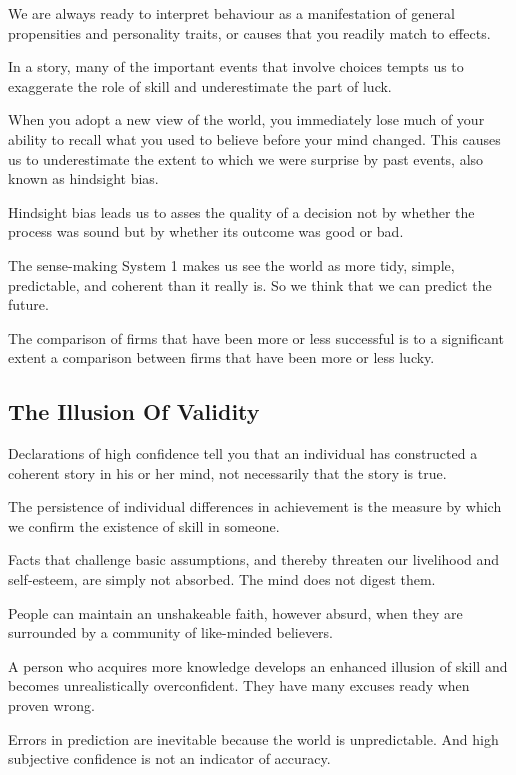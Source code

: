 \bit
\item We are always ready to interpret behaviour as a manifestation of general propensities and personality traits,
or causes that you readily match to effects.
\item In a story, many of the important events that involve choices tempts us to exaggerate the role of skill and
underestimate the part of luck.
\item When you adopt a new view of the world, you immediately lose much of your ability to recall what you used to
believe before your mind changed. This causes us to underestimate the extent to which we were surprise by past
events, also known as hindsight bias.
\item Hindsight bias leads us to asses the quality of a decision not by whether the process was sound but by whether
its outcome was good or bad.
\item The sense-making System 1 makes us see the world as more tidy, simple, predictable, and coherent than it really
is. So we think that we can predict the future.
\item The comparison of firms that have been more or less successful is to a significant extent a comparison between
firms that have been more or less lucky.
\eit

\subsection*{The Illusion Of Validity}

\bit
\item Declarations of high confidence tell you that an individual has constructed a coherent story in his or her
mind, not necessarily that the story is true.
\item The persistence of individual differences in achievement is the measure by which we confirm the existence of
skill in someone.
\item Facts that challenge basic assumptions, and thereby threaten our livelihood and self-esteem, are simply not
absorbed. The mind does not digest them.
\item People can maintain an unshakeable faith, however absurd, when they are surrounded by a community of
like-minded believers.
\item A person who acquires more knowledge develops an enhanced illusion of skill and becomes unrealistically
overconfident. They have many excuses ready when proven wrong.
\item Errors in prediction are inevitable because the world is unpredictable. And high subjective confidence is not
an indicator of accuracy.
\eit

